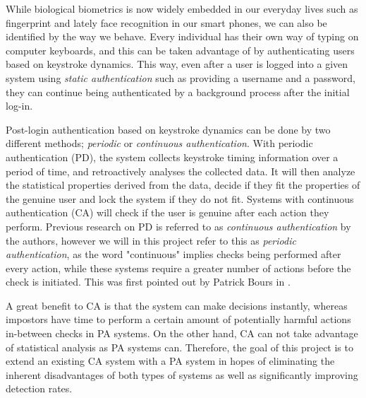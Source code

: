\documentclass[informationsecurity]{gucmasterproject}
\begin{document}

While biological biometrics is now widely embedded in our everyday lives such as fingerprint and lately face recognition in our smart phones, we can also be identified by the way we behave.
Every individual has their own way of typing on computer keyboards, and this can be taken advantage of by authenticating users based on keystroke dynamics.
This way, even after a user is logged into a given system using \textit{static authentication} such as providing a username and a password, they can continue being authenticated by a background process after the initial log-in.

Post-login authentication based on keystroke dynamics can be done by two different methods; \textit{periodic} or \textit{continuous authentication}.
With periodic authentication (PD), the system collects keystroke timing information over a period of time, and retroactively analyses the collected data.
It will then analyze the statistical properties derived from the data, decide if they fit the properties of the genuine user and lock the system if they do not fit.
Systems with continuous authentication (CA) will check if the user is genuine after each action they perform.
Previous research on PD is referred to as \textit{continuous authentication} by the authors, however we will in this project refer to this as \textit{periodic authentication}, as the word "continuous" implies checks being performed after every action, while these systems require a greater number of actions before the check is initiated. This was first pointed out by Patrick Bours in \cite{BOURS201236}.

A great benefit to CA is that the system can make decisions instantly, whereas impostors have time to perform a certain amount of potentially harmful actions in-between checks in PA systems.
On the other hand, CA can not take advantage of statistical analysis as PA systems can.
Therefore, the goal of this project is to extend an existing CA system with a PA system in hopes of eliminating the inherent disadvantages of both types of systems as well as significantly improving detection rates.
\end{document}
